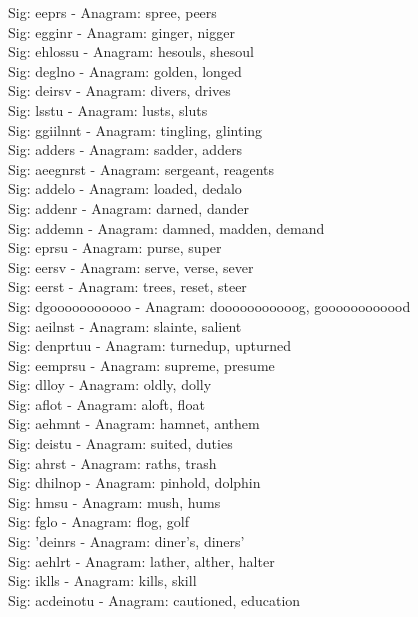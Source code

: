 Sig: {eeprs} - Anagram: spree, peers \\
Sig: {egginr} - Anagram: ginger, nigger \\
Sig: {ehlossu} - Anagram: hesouls, shesoul \\
Sig: {deglno} - Anagram: golden, longed \\
Sig: {deirsv} - Anagram: divers, drives \\
Sig: {lsstu} - Anagram: lusts, sluts \\
Sig: {ggiilnnt} - Anagram: tingling, glinting \\
Sig: {adders} - Anagram: sadder, adders \\
Sig: {aeegnrst} - Anagram: sergeant, reagents \\
Sig: {addelo} - Anagram: loaded, dedalo \\
Sig: {addenr} - Anagram: darned, dander \\
Sig: {addemn} - Anagram: damned, madden, demand \\
Sig: {eprsu} - Anagram: purse, super \\
Sig: {eersv} - Anagram: serve, verse, sever \\
Sig: {eerst} - Anagram: trees, reset, steer \\
Sig: {dgooooooooooo} - Anagram: dooooooooooog, goooooooooood \\
Sig: {aeilnst} - Anagram: slainte, salient \\
Sig: {denprtuu} - Anagram: turnedup, upturned \\
Sig: {eemprsu} - Anagram: supreme, presume \\
Sig: {dlloy} - Anagram: oldly, dolly \\
Sig: {aflot} - Anagram: aloft, float \\
Sig: {aehmnt} - Anagram: hamnet, anthem \\
Sig: {deistu} - Anagram: suited, duties \\
Sig: {ahrst} - Anagram: raths, trash \\
Sig: {dhilnop} - Anagram: pinhold, dolphin \\
Sig: {hmsu} - Anagram: mush, hums \\
Sig: {fglo} - Anagram: flog, golf \\
Sig: {'deinrs} - Anagram: diner's, diners' \\
Sig: {aehlrt} - Anagram: lather, alther, halter \\
Sig: {iklls} - Anagram: kills, skill \\
Sig: {acdeinotu} - Anagram: cautioned, education \\
